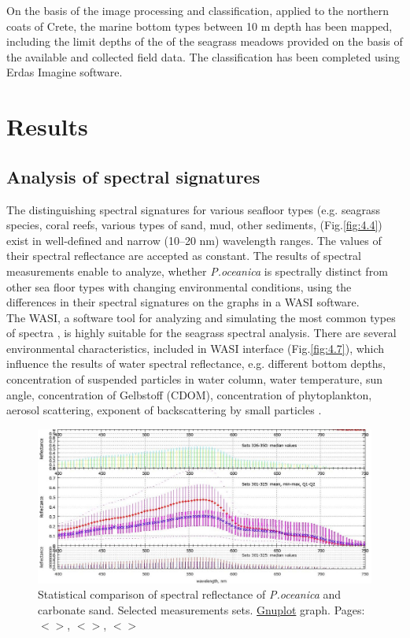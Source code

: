 \documentclass[11pt]{article}
\begin{document}
On the basis of the image processing and classification, applied to the northern coats of Crete, the
marine bottom types between 10 m depth has been mapped, including the limit depths of the of the
seagrass meadows provided on the basis of the available and collected field data. The classification
has been completed using Erdas Imagine software.
\pagebreak

\section{Results}\label{sec:4}

%
\subsection{Analysis of spectral signatures}
The distinguishing spectral signatures for various seafloor types (e.g. seagrass species, coral reefs,
various types of sand, mud, other sediments, (Fig.\ref{fig:4.4})\label{page-31} exist in well-defined and narrow (10–20 nm)
wavelength ranges. 
The values of their spectral reflectance are accepted as constant. The results of
spectral measurements enable to analyze, whether \textit{P.oceanica} is spectrally distinct from other sea
floor types with changing environmental conditions, using the differences in their spectral signatures
on the graphs in a \ac{WASI} software. \\The \ac{WASI}, a
software tool for analyzing and simulating the most common types of spectra \cite{Gege05}\label{Gege05}, is highly
suitable for the seagrass spectral analysis.
There are several environmental characteristics, included in \ac{WASI} interface (Fig.\ref{fig:4.7}), which influence the
results of water spectral reflectance, e.g. different bottom depths, concentration of suspended particles
in water column, water temperature, sun angle, concentration of Gelbstoff (\ac{CDOM}), concentration of phytoplankton, aerosol scattering, exponent of backscattering by small particles \cite{Gege04}\label{Gege04}. 

\begin{figure}[H]
	\centering
	\includegraphics[scale=0.35]{GNU-20-new.jpg}
	\caption{Statistical comparison of spectral reflectance of \textit{P.oceanica} and carbonate sand. Selected measurements sets. \href{http://www.gnuplot.info/}{Gnuplot} graph. Pages: $<$\pageref{page-28}$>$, $<$\pageref{page-47}$>$, $<$\pageref{dataprep}$>$}
	\label{fig:28}
\end{figure}
\end{document}
